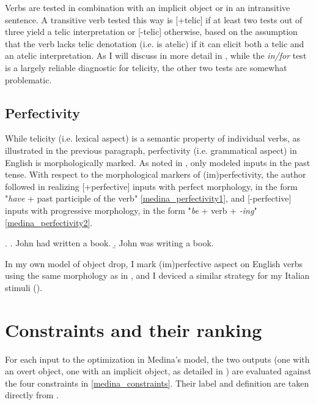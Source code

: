 Verbs are tested in combination with an implicit object or in an intransitive sentence. A transitive verb tested this way is [+telic] if at least two tests out of three yield a telic interpretation or [-telic] otherwise, based on the assumption that the verb lacks telic denotation (i.e. is atelic) if it can elicit both a telic and an atelic interpretation. As I will discuss in more detail in , while the \textit{in/for} test is a largely reliable diagnostic for telicity, the other two tests are somewhat problematic.


\subsection{Perfectivity} While telicity (i.e. lexical aspect) is a semantic property of individual verbs, as illustrated in the previous paragraph, perfectivity (i.e. grammatical aspect) in English is morphologically marked. As noted in , \textcite{Medina2007} only modeled inputs in the past tense. With respect to the morphological markers of (im)perfectivity, the author followed \textcite{Olsen1997} in realizing [+perfective] inputs with perfect morphology, in the form "\textit{have} + past participle of the verb" \ref{medina_perfectivity1}, and [-perfective] inputs with progressive morphology, in the form "\textit{be} + verb + \textit{-ing}" \ref{medina_perfectivity2}.

\ex. \label{medina_perfectivity} \a. \label{medina_perfectivity1} John had written a book.
\b. \label{medina_perfectivity2}  John was writing a book.

In my own model of object drop, I mark (im)perfective aspect on English verbs using the same morphology as in \textcite{Medina2007}, and I deviced a similar strategy for my Italian stimuli ().


\section{Constraints and their ranking} 

For each input to the optimization in Medina's model, the two outputs (one with an overt object, one with an implicit object, as detailed in ) are evaluated against the four constraints in \ref{medina_constraints}. Their label and definition are taken directly from \textcite[72]{Medina2007}.


